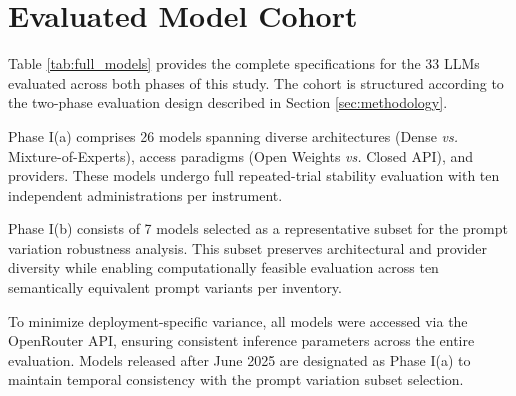 \documentclass[11pt]{article}
\begin{document}
\section{Evaluated Model Cohort}
\label{app:models}

Table \ref{tab:full_models} provides the complete specifications for the 33 LLMs evaluated across both phases of this study. The cohort is structured according to the two-phase evaluation design described in Section \ref{sec:methodology}. 

Phase I(a) comprises 26 models spanning diverse architectures (Dense \textit{vs.} Mixture-of-Experts), access paradigms (Open Weights \textit{vs.} Closed API), and providers. These models undergo full repeated-trial stability evaluation with ten independent administrations per instrument.

Phase I(b) consists of 7 models selected as a representative subset for the prompt variation robustness analysis. This subset preserves architectural and provider diversity while enabling computationally feasible evaluation across ten semantically equivalent prompt variants per inventory.

To minimize deployment-specific variance, all models were accessed via the OpenRouter API, ensuring consistent inference parameters across the entire evaluation. Models released after June 2025 are designated as Phase I(a) to maintain temporal consistency with the prompt variation subset selection.
\end{document}

